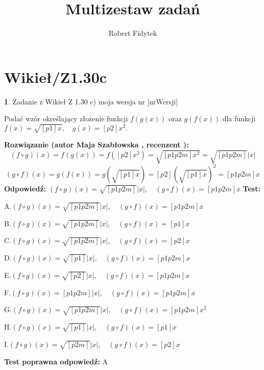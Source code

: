 \documentclass[12pt, a4paper]{article}
\title{Multizestaw zadań}
\author{Robert Fidytek}
\date{}
\theoremstyle{definition} %
\newtheorem{zad}{}
\newcommand{\kategoria}[1]{\section{#1}} %
\newcommand{\zadStart}[1]{\begin{zad}#1\newline} %
\newcommand{\zadStop}{\end{zad}}   %
\newcommand{\rozwStart}[2]{\noindent \textbf{Rozwiązanie (autor #1 , recenzent #2): }\newline} %
\newcommand{\rozwStop}{\newline}                                            %
\newcommand{\odpStart}{\noindent \textbf{Odpowiedź:}\newline}    %
\newcommand{\odpStop}{\newline}                                             %
\newcommand{\testStart}{\noindent \textbf{Test:}\newline} %
\newcommand{\testStop}{\newline} %
\newcommand{\kluczStart}{\noindent \textbf{Test poprawna odpowiedź:}\newline} %
\newcommand{\kluczStop}{\newline} %
\begin{document}
\maketitle


\kategoria{Wikieł/Z1.30c}
\zadStart{Zadanie z Wikieł Z 1.30 c)  moja wersja nr [nrWersji]}


Podać wzór określający złożenie funkcji $f(g(x))$ oraz $g(f(x))$ dla funkcji $f(x)=\sqrt{[p1]x},\quad g(x)=[p2]x^{2}.$
\zadStop
\rozwStart{Maja Szabłowska}{}
$$(f\circ g)(x)=f(g(x))=f([p2]x^{2})=\sqrt{[p1p2m]x^{2}}=\sqrt{[p1p2m]}|x|$$
$$(g\circ f)(x)=g(f(x))=g(\sqrt{[p1]x})=[p2](\sqrt{[p1]x})^{2}=[p1p2m]x$$
\rozwStop
\odpStart
$(f\circ g)(x)=\sqrt{[p1p2m]}|x|, \quad (g\circ f)(x)=[p1p2m]x$
\odpStop
\testStart

A.$(f\circ g)(x)=\sqrt{[p1p2m]}|x|, \quad (g\circ f)(x)=[p1p2m]x$

B.$(f\circ g)(x)=\sqrt{[p1p2m]}|x|, \quad (g\circ f)(x)=[p1]x$

C.$(f\circ g)(x)=\sqrt{[p1p2m]}|x|, \quad (g\circ f)(x)=[p2]x$

D.$(f\circ g)(x)=\sqrt{[p1]}|x|, \quad (g\circ f)(x)=[p1p2m]x$

E.$(f\circ g)(x)=\sqrt{[p2]}|x|, \quad (g\circ f)(x)=[p1p2m]x$

F.$(f\circ g)(x)=[p1p2m]|x|, \quad (g\circ f)(x)=[p1p2m]x$

G.$(f\circ g)(x)=\sqrt{[p1p2m]}|x|, \quad (g\circ f)(x)=[p1p2m]x^{2}$

H.$(f\circ g)(x)=\sqrt{[p1]}|x|, \quad (g\circ f)(x)=[p1]x$

I.$(f\circ g)(x)=\sqrt{[p2m]}|x|, \quad (g\circ f)(x)=[p2]x$

\testStop
\kluczStart
A
\kluczStop
\end{document}
